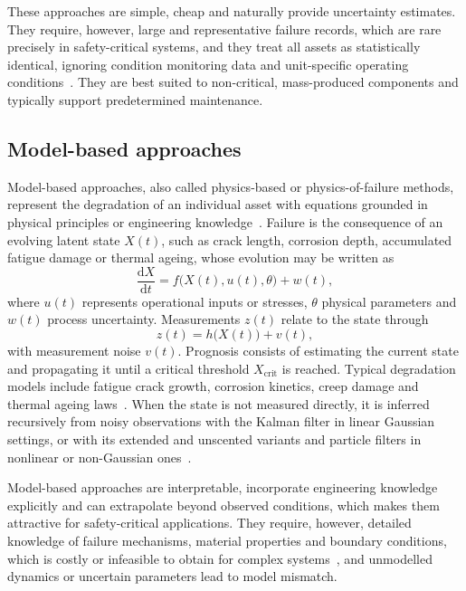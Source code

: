 \documentclass{book}
\begin{document}
These approaches are simple, cheap and naturally provide uncertainty
estimates. They require, however, large and representative failure records,
which are rare precisely in safety-critical systems, and they treat all
assets as statistically identical, ignoring condition monitoring data and
unit-specific operating conditions~\cite{Vachtsevanos2006}. They are best
suited to non-critical, mass-produced components and typically support
predetermined maintenance.

\subsection{Model-based approaches}

Model-based approaches, also called physics-based or physics-of-failure
methods, represent the degradation of an individual asset with equations
grounded in physical principles or engineering
knowledge~\cite{Lei2018,Si2011RUL}. Failure is the consequence of an evolving
latent state $X(t)$, such as crack length, corrosion depth, accumulated
fatigue damage or thermal ageing, whose evolution may be written as
\begin{equation}
  \frac{\mathrm{d}X}{\mathrm{d}t} = f\bigl(X(t), u(t), \theta\bigr) + w(t),
  \label{eq:state}
\end{equation}
where $u(t)$ represents operational inputs or stresses, $\theta$ physical
parameters and $w(t)$ process uncertainty. Measurements $z(t)$ relate to the
state through
\begin{equation}
  z(t) = h\bigl(X(t)\bigr) + v(t),
  \label{eq:measurement}
\end{equation}
with measurement noise $v(t)$. Prognosis consists of estimating the current
state and propagating it until a critical threshold $X_{\mathrm{crit}}$ is
reached. Typical degradation models include fatigue crack growth, corrosion
kinetics, creep damage and thermal ageing laws~\cite{Vachtsevanos2006}. When
the state is not measured directly, it is inferred recursively from noisy
observations with the Kalman filter in linear Gaussian settings, or with its
extended and unscented variants and particle filters in nonlinear or
non-Gaussian ones~\cite{Kalman1960,Maybeck1979,Julier1997,Arulampalam2002}.

Model-based approaches are interpretable, incorporate engineering knowledge
explicitly and can extrapolate beyond observed conditions, which makes them
attractive for safety-critical applications. They require, however, detailed
knowledge of failure mechanisms, material properties and boundary
conditions, which is costly or infeasible to obtain for complex
systems~\cite{Lei2018}, and unmodelled dynamics or uncertain parameters lead to
model mismatch.
\end{document}
